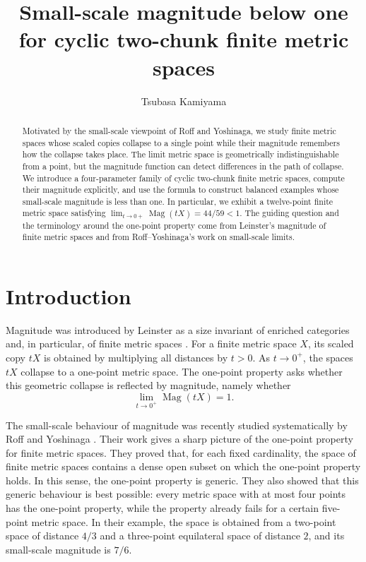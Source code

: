 \documentclass[11pt]{amsart}
\title[Small-scale magnitude below one]{Small-scale magnitude below one for cyclic two-chunk finite metric spaces}
\author{Tsubasa Kamiyama}
\date{}
\numberwithin{equation}{section}
\theoremstyle{definition}
\theoremstyle{remark}
\DeclareMathOperator{\Mag}{Mag}
\begin{document}
\begin{abstract}
Motivated by the small-scale viewpoint of Roff and Yoshinaga, we study finite metric spaces whose scaled copies collapse to a single point while their magnitude remembers how the collapse takes place.  The limit metric space is geometrically indistinguishable from a point, but the magnitude function can detect differences in the path of collapse.  We introduce a four-parameter family of cyclic two-chunk finite metric spaces, compute their magnitude explicitly, and use the formula to construct balanced examples whose small-scale magnitude is less than one.  In particular, we exhibit a twelve-point finite metric space satisfying
\(
\lim_{t\to 0+}\Mag(tX)=44/59<1.
\)
The guiding question and the terminology around the one-point property come from Leinster's magnitude of finite metric spaces and from Roff--Yoshinaga's work on small-scale limits.
\end{abstract}

\maketitle

\section{Introduction}

Magnitude was introduced by Leinster as a size invariant of enriched
categories and, in particular, of finite metric spaces \cite{Leinster2013}.
For a finite metric space \(X\), its scaled copy \(tX\) is obtained by
multiplying all distances by \(t>0\).  As \(t\to 0^+\), the spaces \(tX\)
collapse to a one-point metric space.  The one-point property asks whether
this geometric collapse is reflected by magnitude, namely whether
\begin{equation}\label{eq:one-point-property}
\lim_{t\to 0^+}\Mag(tX)=1.
\end{equation}

The small-scale behaviour of magnitude was recently studied systematically
by Roff and Yoshinaga \cite{RoffYoshinaga2025}.  Their work gives a sharp
picture of the one-point property for finite metric spaces.  They proved
that, for each fixed cardinality, the space of finite metric spaces contains
a dense open subset on which the one-point property holds.  In this sense,
the one-point property is generic.  They also showed that this generic
behaviour is best possible: every metric space with at most four points has
the one-point property, while the property already fails for a certain
five-point metric space.  In their example, the space is obtained from a
two-point space of distance \(4/3\) and a three-point equilateral space of
distance \(2\), and its small-scale magnitude is \(7/6\).
\end{document}
